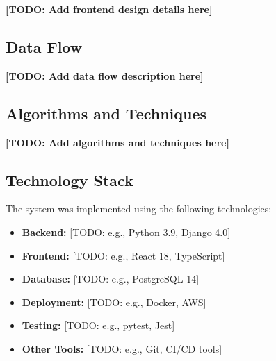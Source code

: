 \textbf{[TODO: Add frontend design details here]}

\subsection{Data Flow}


\textbf{[TODO: Add data flow description here]}

\subsection{Algorithms and Techniques}


\textbf{[TODO: Add algorithms and techniques here]}

\subsection{Technology Stack}


The system was implemented using the following technologies:

\begin{itemize}
  \item \textbf{Backend:} [TODO: e.g., Python 3.9, Django 4.0]
  \item \textbf{Frontend:} [TODO: e.g., React 18, TypeScript]
  \item \textbf{Database:} [TODO: e.g., PostgreSQL 14]
  \item \textbf{Deployment:} [TODO: e.g., Docker, AWS]
  \item \textbf{Testing:} [TODO: e.g., pytest, Jest]
  \item \textbf{Other Tools:} [TODO: e.g., Git, CI/CD tools]
\end{itemize}